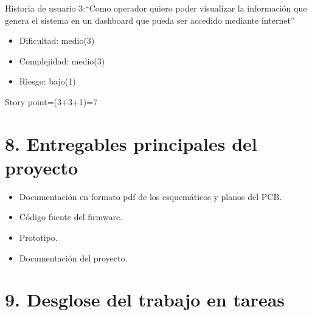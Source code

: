 \documentclass[
11pt, %
codirector, %
]{charter}
\begin{document}
Historia de usuario 3:``Como operador quiero poder visualizar la información que genera el sistema en un dashboard
que pueda ser accedido mediante internet''
\begin{itemize}
	\item Dificultad: medio(3) 
	\item Complejidad: medio(3)
	\item Riesgo: bajo(1)  
\end{itemize}
Story point=(3+3+1)=7

\section{8. Entregables principales del proyecto}
\label{sec:entregables}

\begin{itemize}
	\item Documentación en formato pdf de los esquemáticos y planos del PCB.
	\item Código fuente del firmware.
	\item Prototipo.
	\item Documentación del proyecto.
\end{itemize}

\section{9. Desglose del trabajo en tareas}
\label{sec:wbs}
\end{document}
